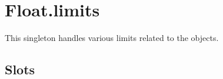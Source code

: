 
\section{Float.limits}
\label{sec:float-limits}

This singleton handles various limits related to the 
objects.

\subsection{Slots}

